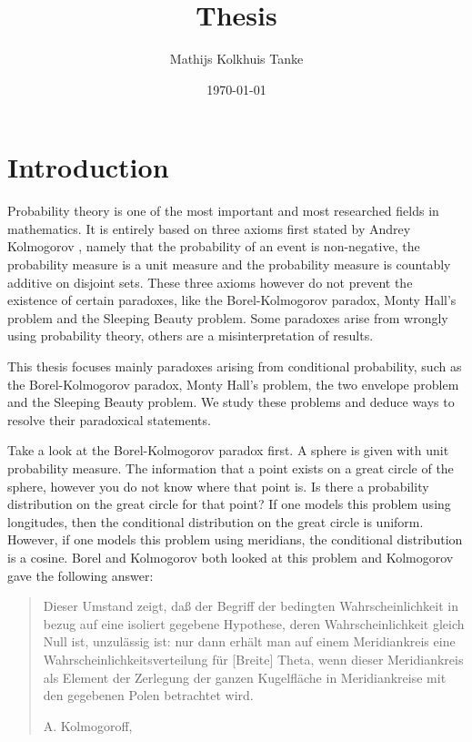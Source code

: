 \documentclass[twoside,a4paper]{report}
\title{Thesis}
\author{Mathijs Kolkhuis Tanke}
\date{\today}
\theoremstyle{plain}
\theoremstyle{definition}
\theoremstyle{remark}
\numberwithin{equation}{chapter}
\DeclareMathOperator{\1}{\mathbbm{1}}
\begin{document}
\begin{titlepage}
\maketitle
\end{titlepage}

\begin{abstract}

\end{abstract}

\tableofcontents

\newpage

\chapter{Introduction}
Probability theory is one of the most important and most researched fields in mathematics. It is entirely based on three axioms first stated by Andrey Kolmogorov \cite{Kolmogorov33}, namely that the probability of an event is non-negative, the probability measure is a unit measure and the probability measure is countably additive on disjoint sets. These three axioms however do not prevent the existence of certain paradoxes, like the Borel-Kolmogorov paradox, Monty Hall's problem and the Sleeping Beauty problem. Some paradoxes arise from wrongly using probability theory, others are a misinterpretation of results.

This thesis focuses mainly paradoxes arising from conditional probability, such as the Borel-Kolmogorov paradox, Monty Hall's problem, the two envelope problem and the Sleeping Beauty problem. We study these problems and deduce ways to resolve their paradoxical statements.

Take a look at the Borel-Kolmogorov paradox first. A sphere is given with unit probability measure. The information that a point exists on a great circle of the sphere, however you do not know where that point is. Is there a probability distribution on the great circle for that point? If one models this problem using longitudes, then the conditional distribution on the great circle is uniform. However, if one models this problem using meridians, the conditional distribution is a cosine. Borel \cite{Borel09} and Kolmogorov \cite{Kolmogorov33} both looked at this problem and Kolmogorov gave the following answer:

\foreignblockquote{ngerman}[A. Kolmogoroff, \cite{Kolmogorov33}]{Dieser Umstand zeigt, daß der Begriff der bedingten Wahrscheinlichkeit in bezug auf eine isoliert gegebene Hypothese, deren Wahrscheinlichkeit gleich Null ist, unzulässig ist: nur dann erhält man auf einem Meridiankreis eine Wahrscheinlichkeitsverteilung für [Breite] Theta, wenn dieser Meridiankreis als Element der Zerlegung der ganzen Kugelfläche in Meridiankreise mit den gegebenen Polen betrachtet wird.}
\end{document}
